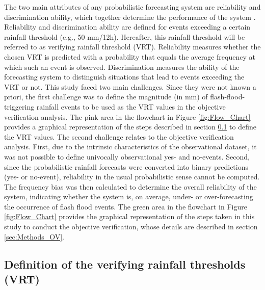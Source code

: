 \documentclass[techmemo]{ecmwfrep}%
\begin{document}
The two main attributes of any probabilistic forecasting system are reliability and discrimination ability, which together determine the performance of the system \citep{Jolliffe2011}. Reliability and discrimination ability are defined for events exceeding a certain rainfall threshold (e.g., 50 mm/12h). Hereafter, this rainfall threshold will be referred to as verifying rainfall threshold (VRT). Reliability measures whether the chosen VRT is predicted with a probability that equals the average frequency at which such an event is observed. Discrimination measures the ability of the forecasting system to distinguish situations that lead to events exceeding the VRT or not. This study faced two main challenges. Since they were not known a priori, the first challenge was to define the magnitude (in mm) of flash-flood-triggering rainfall events to be used as the VRT values in the objective verification analysis. The pink area in the flowchart in Figure \ref{fig:Flow_Chart} provides a graphical representation of the steps described in section \ref{sec:Methods_VRT} to define the VRT values. The second challenge relates to the objective verification analysis. First, due to the intrinsic characteristics of the observational dataset, it was not possible to define univocally observational yes- and no-events. Second, since the probabilistic rainfall forecasts were converted into binary predictions (yes- or no-event), reliability in the usual probabilistic sense cannot be computed. The frequency bias was then calculated to determine the overall reliability of the system, indicating whether the system is, on average, under- or over-forecasting the occurrence of flash flood events. The green area in the flowchart in 
Figure \ref{fig:Flow_Chart} provides the graphical representation of the steps taken in this study to conduct the objective verification, whose details are described in section \ref{sec:Methods_OV}.

\subsection{Definition of the verifying rainfall thresholds (VRT)}
\label{sec:Methods_VRT}
\end{document}
